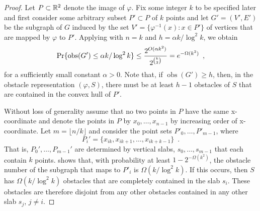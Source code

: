 \documentclass{patmorin}
\DeclareMathOperator{\obs}{obs}
\begin{document}
\begin{proof}
Let $P\subset\mathbb{R}^2$ denote the image of $\varphi$.  Fix some integer $k$ to be
specified later and first consider some arbitrary subset $P'\subset P$
of $k$ points and let $G'=(V',E')$ be the subgraph of $G$ induced by
the set $V'=\{\varphi^{-1}(x):x\in P'\}$ of vertices that are mapped by
$\varphi$ to $P'$.  Applying  with $n=k$ and $h=\alpha
k/\log^2 k$, we obtain
\begin{equation}
     \Pr\{\obs(G') \le \alpha k/\log^2 k\} 
       \le \frac{2^{O(\alpha k^2)}}{2^{\binom{k}{2}}}
       = e^{-\Omega(k^2)} \enspace , \eqlabel{g1}
\end{equation}
for a sufficiently small constant $\alpha > 0$.  Note that, if
$\obs(G')\ge h$, then, in the obstacle representation $(\varphi,S)$,
there must be at least $h-1$ obstacles of $S$ that are contained in the
convex hull of $P'$.

Without loss of generality assume that no two points in $P$ have the
same x-coordinate and denote the points in $P$ by $x_0,\ldots,x_{n-1}$
by increasing order of x-coordinate.  Let $m=\lfloor n/k\rfloor$ and
consider the point sets $P'_0,\ldots,P'_{m-1}$, where
\[ 
  P_i'=\{x_{ik},x_{ik+1},\ldots,x_{ik+k-1}\} \enspace .
\]  
That is, $P_0',\ldots,P_{m-1}'$ are determined by vertical slabs,
$s_0,\ldots,s_{m-1}$ that each contain $k$ points.   shows
that, with probability at least $1-2^{-\Omega(k^2)}$, the obstacle number
of the subgraph that maps to $P'_i$ is $\Omega(k/\log^2 k)$.  If this
occurs, then $S$ has $\Omega(k/\log^2 k)$ obstacles that are completely
contained in the slab $s_i$.  These obstacles are therefore disjoint
from any other obstacles contained in any other slab $s_j$, $j\neq i$.


\end{proof}
\end{document}

